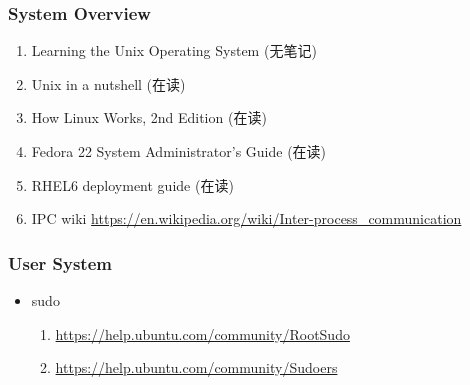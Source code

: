 \documentclass{article}
\begin{document}
\subsubsection{System Overview}
\begin{enumerate}
    \item Learning the Unix Operating System (无笔记)
    \item Unix in a nutshell (在读)
    \item How Linux Works, 2nd Edition (在读)
    \item Fedora 22 System Administrator's Guide (在读)
    \item RHEL6 deployment guide (在读)
    \item IPC wiki \url{https://en.wikipedia.org/wiki/Inter-process_communication}
\end{enumerate}
%
\subsubsection{User System}
%
\begin{itemize}
    \item sudo
        \begin{enumerate}
            \item \url{https://help.ubuntu.com/community/RootSudo}
            \item \url{https://help.ubuntu.com/community/Sudoers}
        \end{enumerate}
\end{itemize}
%
\end{document}
